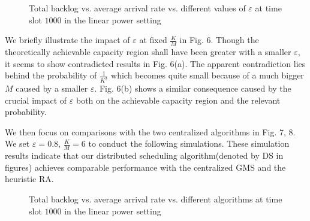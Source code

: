 \documentclass[journal]{IEEEtran}
\begin{document}
\begin{figure}[h]
    \centering
  \hspace{0cm}
   \caption{{\small{Total backlog vs. average arrival rate vs. different values of $\varepsilon$ at time slot $1000$ in the linear power setting}}}
\end{figure}
We briefly illustrate the impact of $\varepsilon$ at fixed $\frac{K}{M}$ in Fig. 6. Though the theoretically achievable capacity region shall have been greater with a smaller $\varepsilon$, it seems to show contradicted results in Fig. 6(a). The apparent contradiction lies behind the probability of $\frac{1}{K^2}$ which becomes quite small because of a much bigger $M$ caused by a smaller $\varepsilon$.   Fig. 6(b) shows a similar consequence caused by the crucial impact of $\varepsilon$ both on the achievable capacity region and the relevant probability.

We then focus on comparisons with the two centralized algorithms in Fig. 7, 8. We set $\varepsilon=0.8 \mbox{, } \frac{K}{M}=6$ to conduct the following simulations. These simulation results indicate that our distributed scheduling algorithm(denoted by DS in figures) achieves comparable performance with the centralized GMS and the heuristic RA.
\begin{figure}[htpb]
    \centering
  \hspace{0cm}
     \caption{{\small{Total backlog vs. average arrival rate  vs. different algorithms at time slot $1000$ in the linear power setting} }}
\end{figure}
\end{document}
